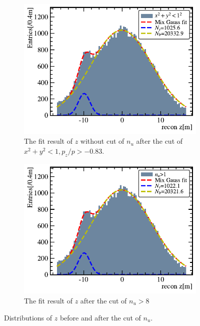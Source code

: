 \begin{figure}[!htbp]
	\centering
	\begin{subfigure}[b]{0.4\textwidth}
		\includegraphics[width=\textwidth]{neutrontag/fastrecon/z_origin.pdf}
		\caption{The fit result of $z$ without cut of $n_u$ after the cut of $x^2+y^2<1, p_z/p>-0.83$.}
		\label{fast:nonucut}
	\end{subfigure}

	\begin{subfigure}[b]{0.4\textwidth}
		\includegraphics[page=8, width=\textwidth]{neutrontag/fastrecon/npmtCut.pdf}
		\caption{The fit result of $z$ after the cut of $n_u>8$}
		\label{fast:exnucut}
	\end{subfigure}
	\caption{Distributions of $z$ before and after the cut of $n_u$.}
	\label{fast:nucut}
\end{figure}

